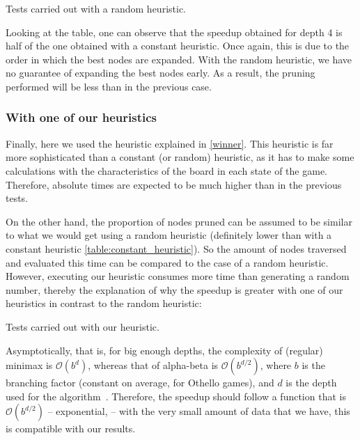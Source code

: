 \documentclass{article}
\begin{document}
\begin{table}[h!]
    \centering
    
    \caption{Tests carried out with a random heuristic.}
    \label{table:our}
\end{table}

Looking at the table, one can observe that the speedup obtained for depth 4 is half of the one obtained with a constant heuristic. Once again, this is due to the order in which the best nodes are expanded. With the random heuristic, we have no guarantee of expanding the best nodes early. As a result, the pruning performed will be less than in the previous case.

\subsubsection{With one of our heuristics }\label{table:our_heuristic}

Finally, here we used the heuristic explained in \ref{winner}. This heuristic is far more sophisticated than a constant (or random) heuristic, as it has to make some calculations with the characteristics of the board in each state of the game. Therefore, absolute times are expected to be much higher than in the previous tests. 

On the other hand, the proportion of nodes pruned can be assumed to be similar to what we would get using a random heuristic (definitely lower than with a constant heuristic \ref{table:constant_heuristic}). So the amount of nodes traversed and evaluated this time can be compared to the case of a random heuristic. However, executing our heuristic consumes more time than generating a random number, thereby the explanation of why the speedup is greater with one of our heuristics in contrast to the random heuristic:


\begin{table}[h!]
    \centering
    
    \caption{Tests carried out with our heuristic.}
    \label{table:our}
\end{table}

\pagebreak

Asymptotically, that is, for big enough depths, the complexity of (regular) minimax is $\mathcal{O}(b^d)$, whereas that of alpha-beta is $\mathcal{O}(b^{d/2})$, where $b$ is the branching factor (constant on average, for Othello games), and $d$ is the depth used for the algorithm~\autocite{russellnorvig}. Therefore, the speedup should follow a function that is $\mathcal{O}(b^{d/2})$ -- exponential, -- with the very small amount of data that we have, this is compatible with our results.
\end{document}
